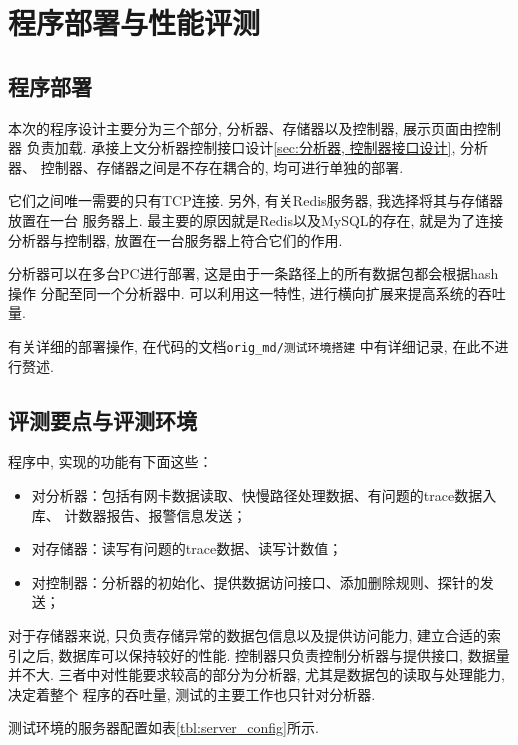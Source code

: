 

\chapter{程序部署与性能评测}
\section{程序部署}

  本次的程序设计主要分为三个部分, 分析器、存储器以及控制器, 展示页面由控制器
负责加载. 承接上文分析器控制接口设计\ref{sec:分析器, 控制器接口设计}, 分析器、
控制器、存储器之间是不存在耦合的, 均可进行单独的部署.

  它们之间唯一需要的只有TCP连接. 另外, 有关Redis服务器, 我选择将其与存储器放置在一台
服务器上. 最主要的原因就是Redis以及MySQL的存在, 就是为了连接分析器与控制器,
放置在一台服务器上符合它们的作用.

  分析器可以在多台PC进行部署, 这是由于一条路径上的所有数据包都会根据hash操作
分配至同一个分析器中. 可以利用这一特性, 进行横向扩展来提高系统的吞吐量.

  有关详细的部署操作, 在代码的文档\texttt{orig\_md/测试环境搭建}\cite{Niftyflow}
中有详细记录, 在此不进行赘述.

\section{评测要点与评测环境}

  程序中, 实现的功能有下面这些：

\begin{itemize}
    \item 对分析器：包括有网卡数据读取、快慢路径处理数据、有问题的trace数据入库、
计数器报告、报警信息发送；
    \item 对存储器：读写有问题的trace数据、读写计数值；
    \item 对控制器：分析器的初始化、提供数据访问接口、添加删除规则、探针的发送；
\end{itemize}

  对于存储器来说, 只负责存储异常的数据包信息以及提供访问能力, 建立合适的索引之后,
数据库可以保持较好的性能. 控制器只负责控制分析器与提供接口, 数据量并不大.
三者中对性能要求较高的部分为分析器, 尤其是数据包的读取与处理能力, 决定着整个
程序的吞吐量, 测试的主要工作也只针对分析器.


测试环境的服务器配置如表\ref{tbl:server_config}所示.

